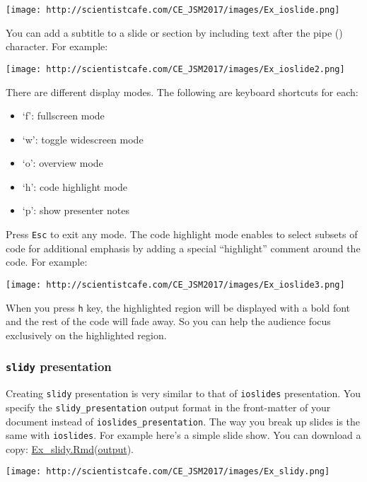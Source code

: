 \documentclass[
]{article}
\begin{document}
\texttt{[image: http://scientistcafe.com/CE\_JSM2017/images/Ex\_ioslide.png]}

You can add a subtitle to a slide or section by including text after the
pipe (\textbar) character. For example:

\texttt{[image: http://scientistcafe.com/CE\_JSM2017/images/Ex\_ioslide2.png]}

There are different display modes. The following are keyboard shortcuts
for each:

\begin{itemize}
\item
  `f': fullscreen mode
\item
  `w': toggle widescreen mode
\item
  `o': overview mode
\item
  `h': code highlight mode
\item
  `p': show presenter notes
\end{itemize}

Press \texttt{Esc} to exit any mode. The code highlight mode enables to
select subsets of code for additional emphasis by adding a special
``highlight'' comment around the code. For example:

\texttt{[image: http://scientistcafe.com/CE\_JSM2017/images/Ex\_ioslide3.png]}

When you press \texttt{h} key, the highlighted region will be displayed
with a bold font and the rest of the code will fade away. So you can
help the audience focus exclusively on the highlighted region.

\hypertarget{slidy-presentation}{%
\subsubsection{\texorpdfstring{\texttt{slidy}
presentation}{slidy presentation}}\label{slidy-presentation}}

Creating \texttt{slidy} presentation is very similar to that of
\texttt{ioslides} presentation. You specify the
\texttt{slidy\_presentation} output format in the front-matter of your
document instead of \texttt{ioslides\_presentation}. The way you break
up slides is the same with \texttt{ioslides}. For example here's a
simple slide show. You can download a copy:
\href{https://raw.githubusercontent.com/happyrabbit/linhui.org/gh-pages/CE_JSM2017/Examples/Ex_slidy.Rmd}{Ex\_slidy.Rmd}(\href{http://scientistcafe.com/CE_JSM2017/Examples/Ex_slidy.html}{output}).

\texttt{[image: http://scientistcafe.com/CE\_JSM2017/images/Ex\_slidy.png]}
\end{document}
